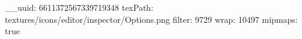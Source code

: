 __uuid: 6611372567339719348
texPath: textures/icons/editor/inspector/Options.png
filter: 9729
wrap: 10497
mipmaps: true